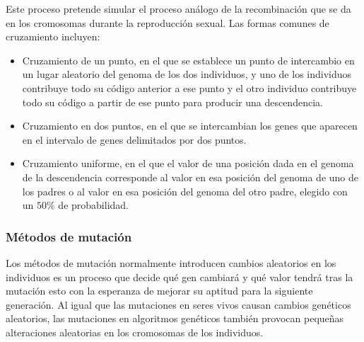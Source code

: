 Este proceso pretende simular el proceso análogo de la recombinación que se da en los cromosomas 
durante la reproducción sexual. Las formas comunes de cruzamiento incluyen:
\begin{itemize}
    \item Cruzamiento de un punto, en el que se establece un punto de intercambio en un lugar aleatorio 
    del genoma de los dos individuos, y uno de los individuos contribuye todo su código anterior a 
    ese punto y el otro individuo contribuye todo su código a partir de ese punto para producir 
    una descendencia.

    \item Cruzamiento en dos puntos, en el que se intercambian los genes que aparecen en el 
    intervalo de genes delimitados por dos puntos.

    \item Cruzamiento uniforme, en el que el valor de una posición dada en el genoma de la 
    descendencia corresponde al valor en esa posición del genoma de uno de los padres o al valor en 
    esa posición del genoma del otro padre, elegido con un $50\%$ de probabilidad.
\end{itemize}


\subsubsection*{Métodos de mutación}

Los métodos de mutación normalmente introducen cambios aleatorios en los individuos es un 
proceso que decide qué gen cambiará y qué valor tendrá tras la mutación esto con la 
esperanza de mejorar su aptitud para la siguiente generación. Al igual que las mutaciones 
en seres vivos causan cambios genéticos aleatorios, las mutaciones en algoritmos genéticos 
también provocan pequeñas alteraciones aleatorias en los cromosomas de los individuos.